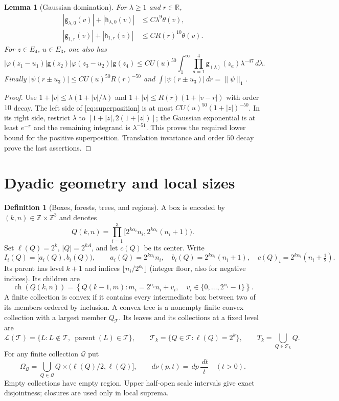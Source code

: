 \documentclass[12pt,reqno]{amsart}
\theoremstyle{plain}
\newtheorem{lemma}[theorem]{Lemma}
\theoremstyle{definition}
\newtheorem{definition}[theorem]{Definition}
\theoremstyle{remark}
\numberwithin{equation}{section}
\newcommand{\R}{\mathbb R}
\newcommand{\Z}{\mathbb Z}
\newcommand{\T}{\mathcal T}
\newcommand{\g}{\mathsf g}
\newcommand{\h}{\mathsf h}
\newcommand{\dd}{\,d}
\DeclareMathOperator{\ch}{ch}
\begin{document}
\begin{lemma}[Gaussian domination]\label{lem:domination}
For $\lambda\ge1$ and $r\in\R$,
\begin{align*}
 |\g_{\lambda,0}(v)|+|\h_{\lambda,0}(v)|&\le C\lambda^9\theta(v),\\
 |\g_{1,r}(v)|+|\h_{1,r}(v)|&\le C R(r)^{10}\theta(v).
\end{align*}
For $z\in E_4$, $u\in E_3$, one also has
\begin{equation}\label{eq:superposition}
 |\varphi(z_1-u_1)|\g(z_2)|\varphi(z_3-u_2)|\g(z_4)
 \le C U(u)^{50}\int_1^\infty
       \prod_{a=1}^4\g_{(\lambda)}(z_a)\lambda^{-47}\dd\lambda.
\end{equation}
Finally $|\psi(r\pm u_3)|\le C U(u)^{50}R(r)^{-50}$ and
$\int|\psi(r\pm u_3)|\dd r=\|\psi\|_1$.
\end{lemma}
\begin{proof}
Use $1+|v|\le\lambda(1+|v|/\lambda)$ and
$1+|v|\le R(r)(1+|v-r|)$ with order $10$ decay.
The left side of \eqref{eq:superposition} is at most
$C U(u)^{50}(1+|z|)^{-50}$. In its right side, restrict
$\lambda$ to $[1+|z|,2(1+|z|)]$; the Gaussian exponential is at
least $e^{-\pi}$ and the remaining integrand is $\lambda^{-51}$.
This proves the required lower bound for the positive superposition.
Translation invariance and order $50$ decay prove the last assertions.
\end{proof}

\section{Dyadic geometry and local sizes}

\begin{definition}[Boxes, forests, trees, and regions]\label{def:tree}
A box is encoded by $(k,n)\in\Z\times\Z^3$ and denotes
\[
 Q(k,n)=\prod_{i=1}^3[2^{k\alpha_i}n_i,2^{k\alpha_i}(n_i+1)).
\]
Set $\ell(Q)=2^k$, $|Q|=2^{kA}$, and let $c(Q)$ be its center.
Write
\[
 I_i(Q)=[a_i(Q),b_i(Q)),\qquad
 a_i(Q)=2^{k\alpha_i}n_i,\quad
 b_i(Q)=2^{k\alpha_i}(n_i+1),\quad
 c(Q)_i=2^{k\alpha_i}(n_i+\tfrac12).
\]
Its parent has level $k+1$ and indices
$\lfloor n_i/2^{\alpha_i}\rfloor$ (integer floor, also for negative
indices). Its children are
\[
 \ch(Q(k,n))=
 \left\{Q(k-1,m):m_i=2^{\alpha_i}n_i+v_i,
          \quad v_i\in\{0,\ldots,2^{\alpha_i}-1\}\right\}.
\]
A finite collection is convex if it contains every intermediate box
between two of its members ordered by inclusion. A convex tree is a
nonempty finite convex collection with a largest member $Q_\T$.
Its leaves and its collections at a fixed level are
\[
 \mathcal L(\T)=\{L:L\notin\T,\ \operatorname{parent}(L)\in\T\},
 \qquad \T_k=\{Q\in\T:\ell(Q)=2^k\},\qquad
 T_k=\bigcup_{Q\in\T_k}Q.
\]
For any finite collection $\mathcal Q$ put
\[
 \Omega_{\mathcal Q}=\bigcup_{Q\in\mathcal Q}
       Q\times(\ell(Q)/2,\ell(Q)],\qquad
 d\nu(p,t)=\dd p\,\frac{\dd t}{t}\quad(t>0).
\]
Empty collections have empty region. Upper half-open scale intervals
give exact disjointness; closures are used only in local suprema.
\end{definition}
\end{document}
